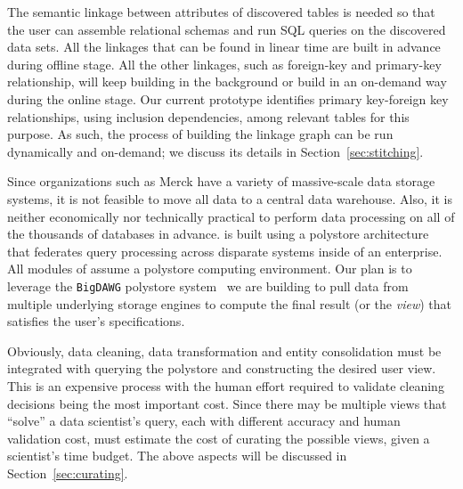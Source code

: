  The semantic linkage between attributes of discovered tables is needed so that the user can assemble relational schemas and run \textsf{SQL} queries on the discovered data sets. All the linkages that can be found in linear time are built in advance during offline stage. All the other linkages, such as foreign-key and primary-key relationship, will keep building in the background or build in an on-demand way during the online stage. Our current prototype identifies primary key-foreign key relationships, using inclusion dependencies, among relevant tables for this purpose. As such, the process of building the linkage graph can be run dynamically and on-demand; we discuss its details in Section~\ref{sec:stitching}.



Since organizations such as  Merck have a variety of massive-scale data storage systems, it is not feasible to move all data to a central data warehouse. Also, it is neither economically nor technically practical to perform data processing on all of the thousands of databases in advance. 
\dcv is built using a polystore architecture~\cite{DBLP:journals/sigmod/DugganESBHKMMMZ15} that federates query processing across disparate systems inside of an enterprise.  All modules of \dcv assume a polystore computing environment.
Our plan is to leverage the \texttt{BigDAWG} polystore system~\cite{DBLP:journals/pvldb/ElmoreDSBCGHHKK15} we are building to  pull data from multiple underlying storage engines to compute the final result (or the {\em view}) that satisfies the user's specifications.



Obviously, data cleaning, data transformation and entity consolidation must be integrated with querying the polystore and constructing the desired user view.  
This is an expensive process with the human effort required to validate cleaning decisions being the most important cost. 
Since there may be multiple views that ``solve'' a data scientist's query, each with different accuracy and human validation cost, \dcv must estimate the cost of curating the possible views,
given a scientist's time budget. 
The above aspects will be discussed in Section~\ref{sec:curating}.


